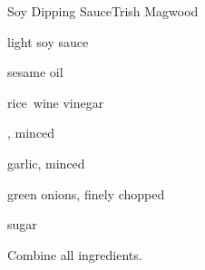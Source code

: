 \begin{recipe}{Soy Dipping Sauce}{Trish Magwood}{}

\begin{ingredients}
\item \C{\half} light soy sauce
\item {} sesame oil
\item {} rice~wine vinegar
\item \Tp{\half} , minced
\item \Tp{\half} garlic, minced
\item \Tp{1\half} green onions, finely chopped
\item \Tp{\half} sugar
\end{ingredients}

\begin{directions}
\item Combine all ingredients.
\end{directions}

\end{recipe}
